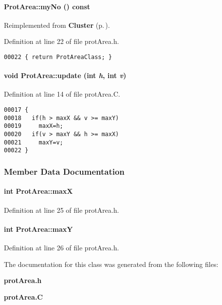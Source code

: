 \paragraph{ Prot\-Area::my\-No () const\hspace{0.3cm}{\tt  [inline, virtual]}}\hfill



Reimplemented from {\bf Cluster} {\rm (p.\,\pageref{Cluster_a3})}.

Definition at line 22 of file prot\-Area.h.\small\begin{verbatim}00022 { return ProtAreaClass; }
\end{verbatim}\normalsize 
\label{ProtArea_a4}
\paragraph{\setlength{\rightskip}{0pt plus 5cm}void Prot\-Area::update (int {\em h}, int {\em v})}\hfill



Definition at line 14 of file prot\-Area.C.\small\begin{verbatim}00017 {
00018   if(h > maxX && v >= maxY)
00019     maxX=h;
00020   if(v > maxY && h >= maxX)
00021     maxY=v;
00022 }
\end{verbatim}\normalsize 


\subsubsection{Member Data Documentation}
\label{ProtArea_m0}
\paragraph{\setlength{\rightskip}{0pt plus 5cm}int Prot\-Area::max\-X}\hfill



Definition at line 25 of file prot\-Area.h.\label{ProtArea_m1}
\paragraph{\setlength{\rightskip}{0pt plus 5cm}int Prot\-Area::max\-Y}\hfill



Definition at line 26 of file prot\-Area.h.

The documentation for this class was generated from the following files:\begin{CompactItemize}
\item 
{\bf prot\-Area.h}\item 
{\bf prot\-Area.C}\end{CompactItemize}

